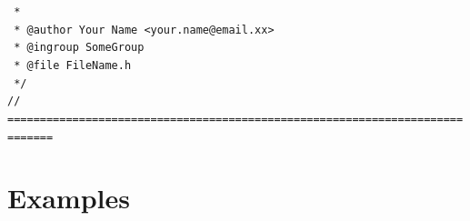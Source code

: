\documentclass[a4paper,twoside,15pt]{book}
\begin{document}
            \verb' '{\color{highlight_c_dox_comment}\verb'*'}\\
            \verb' '{\color{highlight_c_dox_comment}\verb'*'}\verb' '{\color{highlight_c_dox_tag}\verb'@author'}{\color{highlight_c_dox_name}\verb' Your Name <your.name@email.xx>'}\\
            \verb' '{\color{highlight_c_dox_comment}\verb'*'}\verb' '{\color{highlight_c_dox_tag}\verb'@ingroup'}{\color{highlight_c_dox_name}\verb' SomeGroup'}\\
            \verb' '{\color{highlight_c_dox_comment}\verb'*'}\verb' '{\color{highlight_c_dox_tag}\verb'@file'}\verb' '{\color{highlight_c_dox_word}\verb'FileName.h'}\\
            \verb' '{\color{highlight_c_dox_comment}\verb'*/'}\\
            {\color{highlight_c_comment}\verb'// ============================================================================='}\\

\chapter{Examples}
\end{document}
